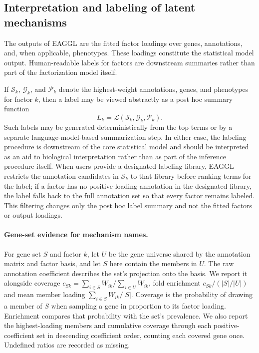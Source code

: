 \documentclass[11pt]{article}
\begin{document}
\subsection{Interpretation and labeling of latent mechanisms}

The outputs of EAGGL are the fitted factor loadings over genes, annotations, and, when applicable, phenotypes. These loadings constitute the statistical model output. Human-readable labels for factors are downstream summaries rather than part of the factorization model itself.

If $\mathcal{S}_k$, $\mathcal{G}_k$, and $\mathcal{P}_k$ denote the highest-weight annotations, genes, and phenotypes for factor $k$, then a label may be viewed abstractly as a post hoc summary function
\[
L_k = \mathcal{L}(\mathcal{S}_k, \mathcal{G}_k, \mathcal{P}_k).
\]
Such labels may be generated deterministically from the top terms or by a separate language-model-based summarization step. In either case, the labeling procedure is downstream of the core statistical model and should be interpreted as an aid to biological interpretation rather than as part of the inference procedure itself. When users provide a designated labeling library, EAGGL restricts the annotation candidates in $\mathcal{S}_k$ to that library before ranking terms for the label; if a factor has no positive-loading annotation in the designated library, the label falls back to the full annotation set so that every factor remains labeled. This filtering changes only the post hoc label summary and not the fitted factors or output loadings.

\paragraph{Gene-set evidence for mechanism names.}
For gene set $S$ and factor $k$, let $U$ be the gene universe shared by the annotation matrix and factor basis, and let $S$ here contain the members in $U$. The raw annotation coefficient describes the set's projection onto the basis. We report it alongside coverage $c_{Sk}=\sum_{i\in S} W_{ik}/\sum_{i\in U} W_{ik}$, fold enrichment $c_{Sk}/(|S|/|U|)$ and mean member loading $\sum_{i\in S} W_{ik}/|S|$. Coverage is the probability of drawing a member of $S$ when sampling a gene in proportion to its factor loading. Enrichment compares that probability with the set's prevalence. We also report the highest-loading members and cumulative coverage through each positive-coefficient set in descending coefficient order, counting each covered gene once. Undefined ratios are recorded as missing.
\end{document}
